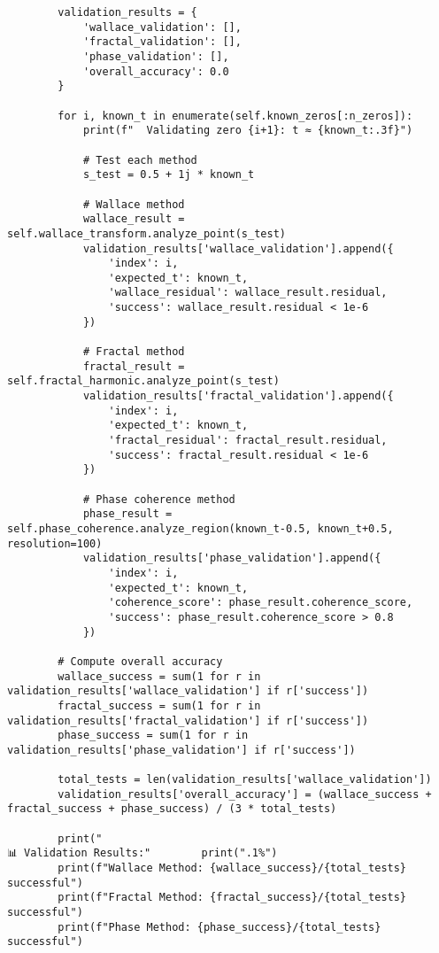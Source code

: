 \documentclass[12pt]{article}
\begin{document}
\begin{lstlisting}
        validation_results = {
            'wallace_validation': [],
            'fractal_validation': [],
            'phase_validation': [],
            'overall_accuracy': 0.0
        }

        for i, known_t in enumerate(self.known_zeros[:n_zeros]):
            print(f"  Validating zero {i+1}: t ≈ {known_t:.3f}")

            # Test each method
            s_test = 0.5 + 1j * known_t

            # Wallace method
            wallace_result = self.wallace_transform.analyze_point(s_test)
            validation_results['wallace_validation'].append({
                'index': i,
                'expected_t': known_t,
                'wallace_residual': wallace_result.residual,
                'success': wallace_result.residual < 1e-6
            })

            # Fractal method
            fractal_result = self.fractal_harmonic.analyze_point(s_test)
            validation_results['fractal_validation'].append({
                'index': i,
                'expected_t': known_t,
                'fractal_residual': fractal_result.residual,
                'success': fractal_result.residual < 1e-6
            })

            # Phase coherence method
            phase_result = self.phase_coherence.analyze_region(known_t-0.5, known_t+0.5, resolution=100)
            validation_results['phase_validation'].append({
                'index': i,
                'expected_t': known_t,
                'coherence_score': phase_result.coherence_score,
                'success': phase_result.coherence_score > 0.8
            })

        # Compute overall accuracy
        wallace_success = sum(1 for r in validation_results['wallace_validation'] if r['success'])
        fractal_success = sum(1 for r in validation_results['fractal_validation'] if r['success'])
        phase_success = sum(1 for r in validation_results['phase_validation'] if r['success'])

        total_tests = len(validation_results['wallace_validation'])
        validation_results['overall_accuracy'] = (wallace_success + fractal_success + phase_success) / (3 * total_tests)

        print("
📊 Validation Results:"        print(".1%")
        print(f"Wallace Method: {wallace_success}/{total_tests} successful")
        print(f"Fractal Method: {fractal_success}/{total_tests} successful")
        print(f"Phase Method: {phase_success}/{total_tests} successful")


\end{lstlisting}
\end{document}

